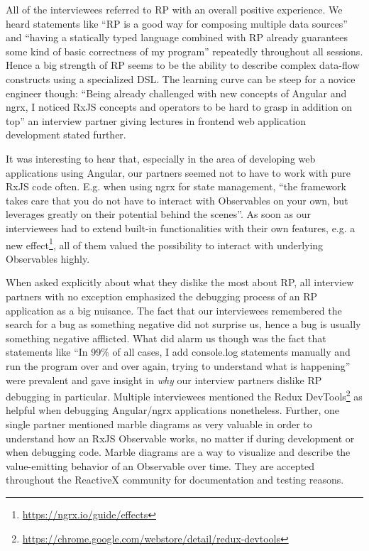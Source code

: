 \documentclass[12pt,a4paper]{article}
\begin{document}
All of the interviewees referred to RP with an overall positive experience. We heard statements like ``RP is a good way for composing multiple data sources'' and ``having a statically typed language combined with RP already guarantees some kind of basic correctness of my program'' repeatedly throughout all sessions. Hence a big strength of RP seems to be the ability to describe complex data-flow constructs using a specialized DSL. The learning curve can be steep for a novice engineer though: ``Being already challenged with new concepts of Angular and ngrx, I noticed RxJS concepts and operators to be hard to grasp in addition on top'' an interview partner giving lectures in frontend web application development stated further.

It was interesting to hear that, especially in the area of developing web applications using Angular, our partners seemed not to have to work with pure RxJS code often. E.g. when using ngrx for state management, ``the framework takes care that you do not have to interact with Observables on your own, but leverages greatly on their potential behind the scenes''. As soon as our interviewees had to extend built-in functionalities with their own features, e.g. a new effect\footnote{\url{https://ngrx.io/guide/effects}}, all of them valued the possibility to interact with underlying Observables highly.

When asked explicitly about what they dislike the most about RP, all interview partners with no exception emphasized the debugging process of an RP application as a big nuisance. The fact that our interviewees remembered the search for a bug as something negative did not surprise us, hence a bug is usually something negative afflicted. What did alarm us though was the fact that statements like ``In 99\% of all cases, I add console.log statements manually and run the program over and over again, trying to understand what is happening'' were prevalent and gave insight in \emph{why} our interview partners dislike RP debugging in particular. Multiple interviewees mentioned the Redux DevTools\footnote{\url{https://chrome.google.com/webstore/detail/redux-devtools}} as helpful when debugging Angular/ngrx applications nonetheless. Further, one single partner mentioned marble diagrams as very valuable in order to understand how an RxJS Observable works, no matter if during development or when debugging code. Marble diagrams are a way to visualize and describe the value-emitting behavior of an Observable over time. They are accepted throughout the ReactiveX community for documentation\cite{marblediagrams} and testing reasons\cite{marbletesting}.
\end{document}
